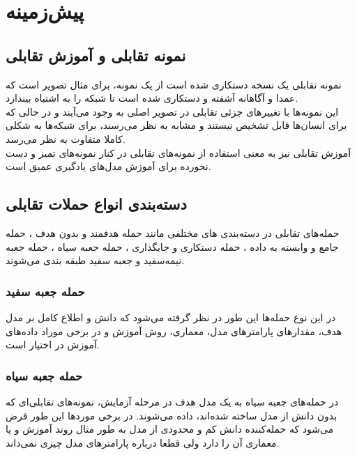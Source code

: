 
\chapter{پیش‌زمینه}
\thispagestyle{empty}

\section{نمونه تقابلی و آموزش تقابلی}
نمونه تقابلی
 یک نسخه دستکاری شده است از یک نمونه، برای مثال تصویر است که عمدا و آگاهانه آشفته و دستکاری شده است تا شبکه را به اشتباه بیندازد.
\\
این نمونه‌ها با تغییر‌های جزئی تقابلی 
در تصویر اصلی به وجود می‌آیند و در حالی که برای انسان‌ها قابل تشخیص نیستند و مشابه
به نظر می‌رسند، برای شبکه‌ها به شکلی کاملا متفاوت به نظر می‌رسد.
\\
آموزش تقابلی 
نیز به معنی استفاده از نمونه‌های تقابلی در کنار نمونه‌های تمیز و دست نخورده برای آموزش مدل‌های یادگیری عمیق است.

\section{دسته‌بندی انواع حملات تقابلی}
حمله‌های تقابلی
در دسته‌بندی های مختلفی مانند حمله هدفمند
و بدون هدف
، حمله جامع
و وابسته به داده
، حمله دستکاری
و جایگذاری
، حمله جعبه سیاه
، حمله جعبه نیمه‌سفید
و جعبه سفید
طبقه بندی می‌شوند.

\subsection{حمله‌ جعبه سفید}
در این نوع حمله‌ها این طور در نظر گرفته می‌شود که دانش و اطلاع کامل بر مدل هدف، مقدار‌های پارامتر‌های مدل، معماری، روش آموزش و در برخی موراد داده‌های آموزش در اختیار است.
\subsection{حمله جعبه سیاه}
در حمله‌های جعبه سیاه به یک مدل هدف در مرحله آزمایش، نمونه‌های تقابلی‌ای که بدون دانش از مدل ساخته شده‌اند، داده می‌شوند. در برخی مورد‌ها این طور فرض می‌شود که حمله‌کننده دانش کم و محدودی از مدل به طور مثال روند آموزش و یا معماری آن را دارد ولی قطعا درباره پارامتر‌های مدل چیزی نمی‌داند. 
